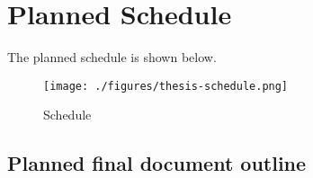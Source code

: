 \hypertarget{planned-schedule}{%
  \section{Planned Schedule}\label{planned-schedule}}

The planned schedule is shown below.

\begin{figure}
  \centering
  \texttt{[image: ./figures/thesis-schedule.png]}
  \caption{Schedule}
\end{figure}

\hypertarget{planned-final-document-outline}{%
  \subsection{Planned final document
    outline}\label{planned-final-document-outline}}
